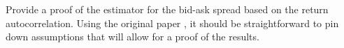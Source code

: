 Provide a proof of the \citeauthor{roll1984simple} estimator for the bid-ask spread based on the return autocorrelation. Using the original paper \citep{roll1984simple}, it should be straightforward to pin down assumptions that will allow for a proof of the results.